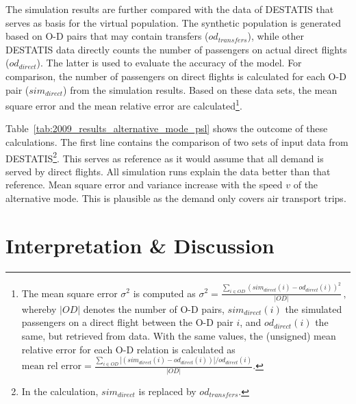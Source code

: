 The simulation results are further compared with the data of DESTATIS that serves as basis for the virtual population.  
The synthetic population is generated based on O-D pairs that may contain transfers ($od_{transfers}$), 
while other DESTATIS data directly counts the number of passengers on actual direct flights ($od_{direct}$). %
The latter is used to evaluate the accuracy of the model.
For comparison, the number of passengers on direct flights is calculated for each O-D pair ($sim_{direct}$) from the simulation results.
Based on these data sets, the mean square error and the mean relative error are calculated\footnote{
The mean square error $\sigma^2$ is computed as
	$\sigma^2 = \frac{\sum_{i \in OD} (sim_{direct}(i) - od_{direct}(i))^2}{|OD|} \, , $
whereby $|OD|$ denotes the number of O-D pairs, $sim_{direct}(i)$ the simulated passengers on a direct flight between the O-D pair $i$, and $od_{direct}(i)$ the same, but retrieved from data.  
With the same values, the (unsigned) mean relative error for each O-D relation is calculated as
$
\mbox{mean rel error} = \frac{\sum_{i \in OD} |(sim_{direct}(i) - od_{direct}(i))|/ od_{direct}(i)}{|OD|}.
$
}. 

Table~\ref{tab:2009_results_alternative_mode_psl} shows the outcome of these calculations. 
The first line contains the comparison of two sets of input data from DESTATIS\footnote{In the calculation, $sim_{direct}$ is replaced by $od_{transfers}$.}. 
This serves as reference as it would assume that all demand is served by direct flights.
All simulation runs explain the data better than that reference.
Mean square error and variance increase with the speed $v$ of the alternative mode.  
This is plausible as the demand only covers air transport trips. 

\section{Interpretation \& Discussion}
\label{sec:air_rail_discussion}

